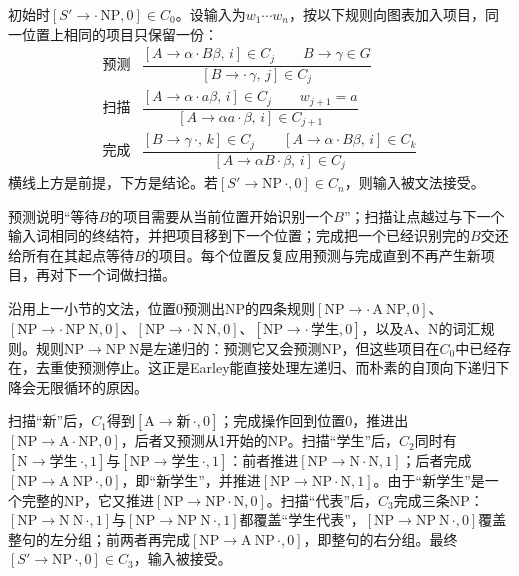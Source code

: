 \begin{definition}[Earley的三条推理规则]
  \label{def:nlp-analysis-earley-rules}
  初始时$[S'\to\cdot\,\mathrm{NP},0]\in C_0$。设输入为$w_1\cdots w_n$，按以下规则向图表加入项目，同一位置上相同的项目只保留一份：
  \[
  \begin{array}{lll}
   \text{预测}&
   \dfrac{[A\to\alpha\cdot B\beta,\,i]\in C_j\qquad B\to\gamma\in G}
         {[B\to\cdot\,\gamma,\,j]\in C_j}\\[3.2ex]
   \text{扫描}&
   \dfrac{[A\to\alpha\cdot a\beta,\,i]\in C_j\qquad w_{j+1}=a}
         {[A\to\alpha a\cdot\beta,\,i]\in C_{j+1}}\\[3.2ex]
   \text{完成}&
   \dfrac{[B\to\gamma\,\cdot,\,k]\in C_j\qquad[A\to\alpha\cdot B\beta,\,i]\in C_k}
         {[A\to\alpha B\cdot\beta,\,i]\in C_j}
  \end{array}
  \]
  横线上方是前提，下方是结论。若$[S'\to\mathrm{NP}\,\cdot,0]\in C_n$，则输入被文法接受。
\end{definition}

预测说明“等待$B$的项目需要从当前位置开始识别一个$B$”；扫描让点越过与下一个输入词相同的终结符，并把项目移到下一个位置；完成把一个已经识别完的$B$交还给所有在其起点等待$B$的项目。每个位置反复应用预测与完成直到不再产生新项目，再对下一个词做扫描。

沿用上一小节的文法，位置0预测出NP的四条规则$[\mathrm{NP}\to\cdot\,\mathrm A\ \mathrm{NP},0]$、$[\mathrm{NP}\to\cdot\,\mathrm{NP}\ \mathrm N,0]$、$[\mathrm{NP}\to\cdot\,\mathrm N\ \mathrm N,0]$、$[\mathrm{NP}\to\cdot\,\text{学生},0]$，以及A、N的词汇规则。规则$\mathrm{NP}\to\mathrm{NP}\ \mathrm N$是左递归的：预测它又会预测NP，但这些项目在$C_0$中已经存在，去重使预测停止。这正是Earley能直接处理左递归、而朴素的自顶向下递归下降会无限循环的原因。

扫描“新”后，$C_1$得到$[\mathrm A\to\text{新}\,\cdot,0]$；完成操作回到位置0，推进出$[\mathrm{NP}\to\mathrm A\cdot\mathrm{NP},0]$，后者又预测从1开始的NP。扫描“学生”后，$C_2$同时有$[\mathrm N\to\text{学生}\,\cdot,1]$与$[\mathrm{NP}\to\text{学生}\,\cdot,1]$：前者推进$[\mathrm{NP}\to\mathrm N\cdot\mathrm N,1]$；后者完成$[\mathrm{NP}\to\mathrm A\ \mathrm{NP}\,\cdot,0]$，即“新学生”，并推进$[\mathrm{NP}\to\mathrm{NP}\cdot\mathrm N,1]$。由于“新学生”是一个完整的NP，它又推进$[\mathrm{NP}\to\mathrm{NP}\cdot\mathrm N,0]$。扫描“代表”后，$C_3$完成三条NP：$[\mathrm{NP}\to\mathrm N\ \mathrm N\,\cdot,1]$与$[\mathrm{NP}\to\mathrm{NP}\ \mathrm N\,\cdot,1]$都覆盖“学生代表”，$[\mathrm{NP}\to\mathrm{NP}\ \mathrm N\,\cdot,0]$覆盖整句的左分组；前两者再完成$[\mathrm{NP}\to\mathrm A\ \mathrm{NP}\,\cdot,0]$，即整句的右分组。最终$[S'\to\mathrm{NP}\,\cdot,0]\in C_3$，输入被接受。

